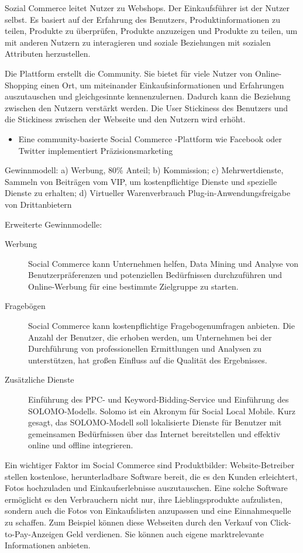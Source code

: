 Sozial Commerce leitet Nutzer zu Webshops. Der Einkaufsführer ist der Nutzer selbst. Es basiert auf der Erfahrung des Benutzers, Produktinformationen zu teilen, Produkte zu überprüfen, Produkte anzuzeigen und Produkte zu teilen, um mit anderen Nutzern zu interagieren und soziale Beziehungen mit sozialen Attributen herzustellen.

Die Plattform erstellt die Community. Sie bietet für viele Nutzer von Online-Shopping einen Ort, um miteinander Einkaufsinformationen und Erfahrungen auszutauschen und gleichgesinnte kennenzulernen. Dadurch kann die Beziehung zwischen den Nutzern verstärkt werden. Die User Stickiness des Benutzers und die Stickiness zwischen der Webseite und den Nutzern wird erhöht.

\begin{itemize}
\item Eine community-basierte Social Commerce -Plattform wie Facebook oder Twitter implementiert Präzisionsmarketing
\end{itemize}

Gewinnmodell: a) Werbung, 80\% Anteil; b) Kommission; c)  Mehrwertdienste, Sammeln von Beiträgen vom VIP, um kostenpflichtige Dienste und spezielle Dienste zu erhalten; d)  Virtueller Warenverbrauch Plug-in-Anwendungsfreigabe von Drittanbietern

Erweiterte Gewinnmodelle:

\begin{description}
\item[Werbung] Social Commerce kann Unternehmen helfen, Data Mining und Analyse von Benutzerpräferenzen und potenziellen Bedürfnissen durchzuführen und Online-Werbung für eine bestimmte Zielgruppe zu starten.
\item[Fragebögen] Social Commerce kann kostenpflichtige Fragebogenumfragen anbieten. Die Anzahl der Benutzer, die erhoben werden, um Unternehmen bei der Durchführung von professionellen Ermittlungen und Analysen zu unterstützen, hat großen Einfluss auf die Qualität des Ergebnisses.
\item[Zusätzliche Dienste] Einführung des PPC- und Keyword-Bidding-Service und Einführung des SOLOMO-Modells. Solomo ist ein Akronym für Social Local Mobile. Kurz gesagt, das SOLOMO-Modell soll lokalisierte Dienste für Benutzer mit gemeinsamen Bedürfnissen über das Internet bereitstellen und effektiv online und offline integrieren.
\end{description}

Ein wichtiger Faktor im Social Commerce sind Produktbilder: Website-Betreiber stellen kostenlose, herunterladbare Software bereit, die es den Kunden erleichtert, Fotos hochzuladen und Einkaufserlebnisse auszutauschen. Eine solche Software ermöglicht es den Verbrauchern nicht nur, ihre Lieblingsprodukte aufzulisten, sondern auch die Fotos von Einkaufslisten anzupassen und eine Einnahmequelle zu schaffen. Zum Beispiel können diese Webseiten durch den Verkauf von Click-to-Pay-Anzeigen Geld verdienen. Sie können auch eigene marktrelevante Informationen anbieten.


